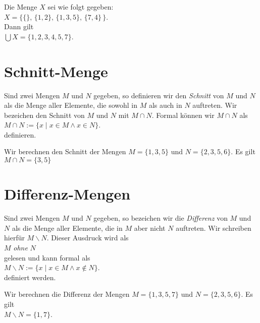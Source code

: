 \example
Die Menge $X$ sei wie folgt gegeben: \\[0.2cm]
\hspace*{1.3cm}
 $X = \big\{ \{\},\, \{1,2\}, \, \{1,3,5\}, \, \{7,4\}\,\big\}$. \\[0.2cm]
Dann gilt \\[0.2cm]
\hspace*{1.3cm}
 $\bigcup X = \{ 1, 2, 3, 4, 5, 7 \}$. \eox

\section{Schnitt-Menge}
Sind zwei Mengen $M$ und $N$ gegeben, so definieren wir den \emph{Schnitt} von
$M$ und $N$ als die Menge aller Elemente, die sowohl in $M$ als auch in $N$
auftreten.  Wir bezeichen den Schnitt von $M$ und $N$ mit $M \cap N$.
Formal k\"{o}nnen wir $M \cap N$ als 
\\[0.2cm]
\hspace*{1.3cm} $M \cap N := \{ x \mid x \in M \wedge x \in N \}$.
\\[0.2cm]
definieren.


\example
Wir berechnen den Schnitt der  Mengen $M = \{ 1, 3, 5 \}$ und $N = \{ 2, 3, 5, 6 \}$.  Es gilt
\\[0.2cm]
\hspace*{1.3cm} $M \cap N = \{ 3, 5 \}$
\eox

\section{Differenz-Mengen}
 Sind zwei Mengen $M$ und $N$ gegeben, so bezeichen wir die \emph{Differenz} von
 $M$ und $N$ als die Menge aller Elemente, die in $M$ aber nicht $N$
 auftreten.  Wir schreiben hierf\"{u}r $M \backslash N$.  Dieser Ausdruck wird als
\\[0.2cm]
\hspace*{1.3cm}
$M$ \emph{ohne} $N$
\\[0.2cm]
gelesen und kann formal als
 \\[0.2cm]
\hspace*{1.3cm} $M \backslash N := \{ x \mid x \in M \wedge x \not\in N \}$. 
 \\[0.2cm] 
definiert werden.


\example
Wir berechnen die Differenz der Mengen $M = \{ 1, 3, 5, 7 \}$ und $N = \{ 2, 3, 5, 6 \}$.  Es gilt
\\[0.2cm]
\hspace*{1.3cm} $M \backslash N = \{ 1, 7 \}$. \eox

